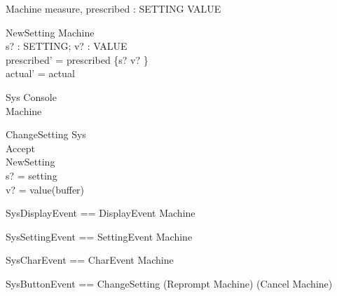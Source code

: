 \documentclass{llncs}
\begin{document}
\begin{schema}{Machine}
measure, prescribed : SETTING \fun VALUE
\end{schema}
\begin{schema}{NewSetting}
\Delta Machine \\
s? : SETTING; v? : VALUE \\
\where prescribed' = prescribed \oplus \{s? \mapsto v? \}\\
actual' = actual
\end{schema}
\begin{schema}{Sys}
Console \\
Machine
\end{schema}
\begin{schema}{ChangeSetting}
\Delta Sys \\
Accept \\
NewSetting \\
\where s? = setting \\
v? = value(buffer)
\end{schema}
\begin{zed}
SysDisplayEvent == DisplayEvent \land \Xi Machine
\end{zed}
\begin{zed}
SysSettingEvent == SettingEvent \land \Xi Machine
\end{zed}
\begin{zed}
SysCharEvent == CharEvent \land \Xi Machine
\end{zed}
\begin{zed}
SysButtonEvent == ChangeSetting \lor (Reprompt \land \Xi
Machine) \lor (Cancel \land \Xi Machine)
\end{zed}
\end{document}
